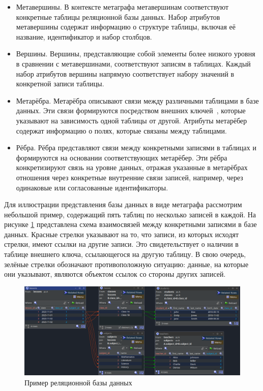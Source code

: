 \begin{itemize}
  \item Метавершины. В контексте метаграфа метавершинам соответствуют конкретные таблицы реляционной базы данных. Набор атрибутов метавершины содержат информацию о структуре таблицы, включая её название, идентификатор и набор столбцов.

  \item Вершины. Вершины, представляющие собой элементы более низкого уровня в сравнении с метавершинами, соответствуют записям в таблицах. Каждый набор атрибутов вершины напрямую соответствует набору значений в конкретной записи таблицы.

  \item Метарёбра. Метарёбра описывают связи между различными таблицами в базе данных. Эти связи формируются посредством внешних ключей~\cite{foreign-key}, которые указывают на зависимость одной таблицы от другой. Атрибуты метарёбер содержат информацию о полях, которые связаны между таблицами.

  \item Рёбра. Рёбра представляют связи между конкретными записями в таблицах и формируются на основании соответствующих метарёбер. Эти рёбра конкретизируют связь на уровне данных, отражая указанные в метарёбрах отношения через конкретные внутренние связи записей, например, через одинаковые или согласованные идентификаторы.
\end{itemize}

Для иллюстрации представления базы данных в виде метаграфа рассмотрим небольшой пример, содержащий пять таблиц по несколько записей в каждой. На рисунке \ref{db-example} представлена схема взаимосвязей между конкретными записями в базе данных. Красные стрелки указывают на то, что записи, из которых исходят стрелки, имеют ссылки на другие записи. Это свидетельствует о наличии в таблице внешнего ключа, ссылающегося на другую таблицу. В свою очередь, зелёные стрелки обозначают противоположную ситуацию: данные, на которые они указывают, являются объектом ссылок со стороны других записей.

\begin{figure}
  \includegraphics[scale=0.5]{./img/jailer-example-db-overview.png}
  \caption{Пример реляционной базы данных}
  \label{db-example}
\end{figure}

